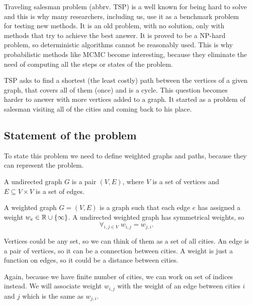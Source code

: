 Traveling salesman problem (abbrv. TSP) is a well known for being hard to solve and this is why many researchers, including us, use it as a benchmark problem for testing new methods. It is an old problem, with no solution, only with methods that try to achieve the best answer. It is proved to be a NP-hard problem, so deterministic algorithms cannot be reasonably used. This is why probabilistic methods like MCMC become interesting, because they eliminate the need of computing all the steps or states of the problem.

TSP asks to find a shortest (the least costly) path between the vertices of a given graph, that covers all of them (once) and is a cycle. This question becomes harder to answer with more vertices added to a graph. It started as a problem of salesman visiting all of the cities and coming back to his place.

\subsection{Statement of the problem}
	To state this problem we need to define weighted graphs and paths, because they can represent the problem. 
	
	\begin{definition}
		A undirected graph $G$ is a pair $(V, E)$, where $V$ is a set of vertices and $E \subseteq V \times V$ is a set of edges.
	\end{definition}
	\begin{definition}
		A weighted graph $G = (V, E)$ is a graph such that each edge $e$ has assigned a weight $w_e \in \mathbb{R} \cup \left\{ \infty \right\}$. A undirected weighted graph has symmetrical weights, so
		\begin{equation*}
			\forall_{i,j \in V} \; w_{i,j} = w_{j,i}.
		\end{equation*}
	\end{definition}
	Vertices could be any set, so we can think of them as a set of all cities. An edge is a pair of vertices, so it can be a connection between cities. A weight is just a function on edges, so it could be a distance between cities. 
	
	Again, because we have finite number of cities, we can work on set of indices instead. We will associate weight $w_{i,j}$ with the weight of an edge between cities $i$ and $j$ which is the same as $w_{j,i}$.
	

